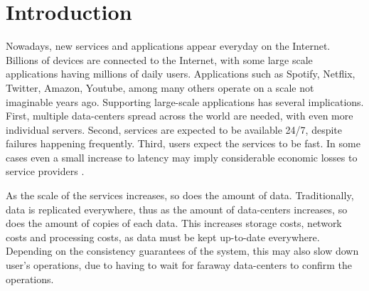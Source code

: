 
%

\chapter{Introduction}
\label{cha:introduction}





Nowadays, new services and applications appear everyday on the Internet.
Billions of devices are connected to the Internet, with some large scale applications having millions of daily users.
Applications such as Spotify, Netflix, Twitter, Amazon, Youtube, among many others operate on a scale not imaginable years ago.
Supporting large-scale applications has several implications.
First, multiple data-centers spread across the world are needed, with even more individual servers.
Second, services are expected to be available 24/7, despite failures happening frequently.
Third, users expect the services to be fast. 
In some cases even a small increase to latency may imply considerable economic losses to service providers \cite{dynamo,eiger}.

As the scale of the services increases, so does the amount of data.
Traditionally, data is replicated everywhere, thus as the amount of data-centers increases, so does the amount of copies of each data.
This increases storage costs, network costs and processing costs, as data must be kept up-to-date everywhere.
Depending on the consistency guarantees of the system, this may also slow down user's operations, due to having to wait for faraway data-centers to confirm the operations.

